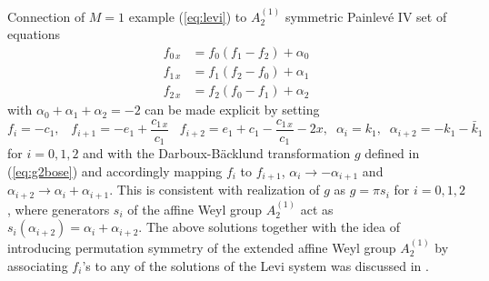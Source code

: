 \documentclass[12pt]{article}
\numberwithin{equation}{section}
\def\rf#1{(\ref{eq:#1})}
\begin{document}
Connection of $M=1$ example \rf{levi}
to $A^{(1)}_2$  symmetric Painlev\'e IV set
of equations
\[
\begin{split}
f_{0\, x}&= f_0 (f_1-f_2) + \alpha_0 \\
f_{1\, x}&= f_1 (f_2-f_0) + \alpha_1 \\
f_{2\, x}&= f_2 (f_0-f_1) + \alpha_2 
\end{split}
\]
with $\alpha_0 + \alpha_1 + \alpha_2 =-2$ can be made explicit by setting 
\[
f_i=-c_1,\;\;\; f_{i+1}=-e_1+\frac{c_{1\,x}}{c_1} \;\;\; f_{i+2}= e_1+c_1-\frac{c_{1\,x}}{c_1}-2x,
\;\; \alpha_i=k_1, \;\; \alpha_{i+2}=-k_1-{\bar k}_1
\]
for $i=0,1,2$ and
with the Darboux-B\"acklund transformation $g$ defined in \rf{g2bose}
and accordingly mapping $f_i$ to $f_{i+1}$, $\alpha_i \to - \alpha_{i+1}$ and $\alpha_{i+2} \to
\alpha_i+\alpha_{i+1}$.
This is consistent with realization of $g$ as $g =\pi s_{i}$ 
for $i=0,1,2$, where generators $s_i$ of the affine Weyl group $A^{(1)}_2$ act as
$s_i (\alpha_{i+2})=\alpha_i+\alpha_{i+2}$. 
The above solutions together with the idea of introducing 
permutation symmetry of the extended affine Weyl group $A^{(1)}_2$
by associating $f_i$'s to any of the solutions of the Levi system
was discussed in \cite{Aratyn:09}.
\end{document}

